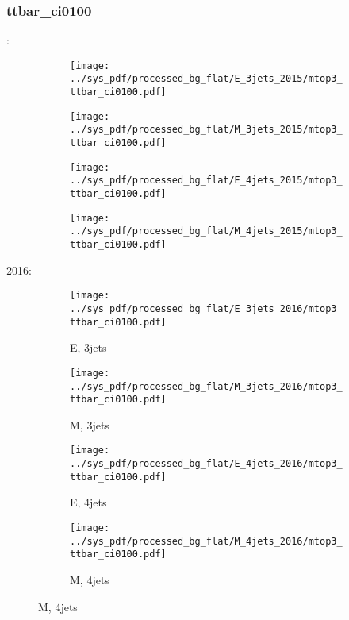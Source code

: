 \documentclass{beamer}
\begin{document}
\begin{frame}
\frametitle{ttbar_ci0100}
\fontsize{5}{1}:
\begin{figure}
\centering
\begin{subfigure}[b]{0.24\textwidth}
\texttt{[image: ../sys\_pdf/processed\_bg\_flat/E\_3jets\_2015/mtop3\_ttbar\_ci0100.pdf]}
\end{subfigure}
\begin{subfigure}[b]{0.24\textwidth}
\texttt{[image: ../sys\_pdf/processed\_bg\_flat/M\_3jets\_2015/mtop3\_ttbar\_ci0100.pdf]}
\end{subfigure}
\begin{subfigure}[b]{0.24\textwidth}
\texttt{[image: ../sys\_pdf/processed\_bg\_flat/E\_4jets\_2015/mtop3\_ttbar\_ci0100.pdf]}
\end{subfigure}
\begin{subfigure}[b]{0.24\textwidth}
\texttt{[image: ../sys\_pdf/processed\_bg\_flat/M\_4jets\_2015/mtop3\_ttbar\_ci0100.pdf]}
\end{subfigure}
\end{figure}
2016:
\begin{figure}
\centering
\begin{subfigure}[b]{0.24\textwidth}
\texttt{[image: ../sys\_pdf/processed\_bg\_flat/E\_3jets\_2016/mtop3\_ttbar\_ci0100.pdf]}
\captionsetup{font=tiny}
\caption{E, 3jets}
\end{subfigure}
\begin{subfigure}[b]{0.24\textwidth}
\texttt{[image: ../sys\_pdf/processed\_bg\_flat/M\_3jets\_2016/mtop3\_ttbar\_ci0100.pdf]}
\captionsetup{font=tiny}
\caption{M, 3jets}
\end{subfigure}
\begin{subfigure}[b]{0.24\textwidth}
\texttt{[image: ../sys\_pdf/processed\_bg\_flat/E\_4jets\_2016/mtop3\_ttbar\_ci0100.pdf]}
\captionsetup{font=tiny}
\caption{E, 4jets}
\end{subfigure}
\begin{subfigure}[b]{0.24\textwidth}
\texttt{[image: ../sys\_pdf/processed\_bg\_flat/M\_4jets\_2016/mtop3\_ttbar\_ci0100.pdf]}
\captionsetup{font=tiny}
\caption{M, 4jets}
\end{subfigure}
\end{figure}
\end{frame}
\end{document}
